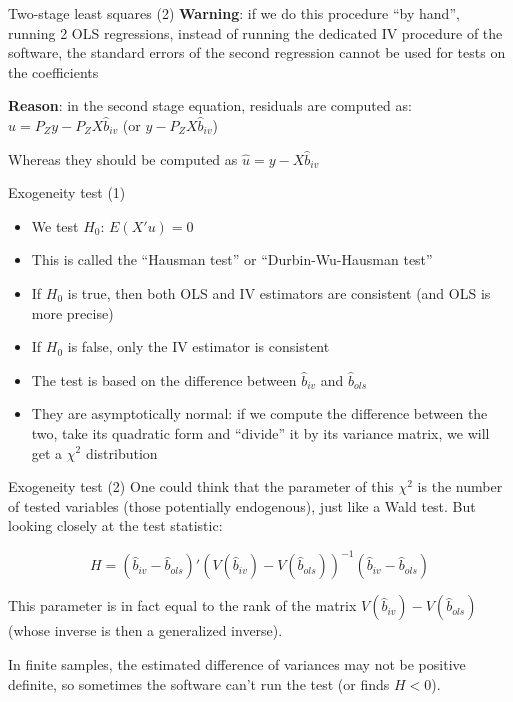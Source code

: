 \documentclass[aspectratio=169]{beamer}
\begin{document}
\begin{frame}{Two-stage least squares (2)}
\textbf{Warning}: if we do this procedure ``by hand'', running 2 OLS regressions, instead of running the dedicated IV procedure of the software, the standard errors of the second regression cannot be used for tests on the coefficients

\textbf{Reason}: in the second stage equation, residuals are computed as: $\hat{u} = P_Zy - P_ZX\hat{b}_{iv}$ (or $y - P_ZX\hat{b}_{iv}$)

Whereas they should be computed as $\hat{u} = y - X\hat{b}_{iv}$
\end{frame}

\begin{frame}{Exogeneity test (1)}
\begin{itemize}
    \item We test $H_0$: $E(X'u) = 0$
    \item This is called the ``Hausman test'' or ``Durbin-Wu-Hausman test''
    \item If $H_0$ is true, then both OLS and IV estimators are consistent (and OLS is more precise)
    \item If $H_0$ is false, only the IV estimator is consistent
    \item The test is based on the difference between $\hat{b}_{iv}$ and $\hat{b}_{ols}$
    \item They are asymptotically normal: if we compute the difference between the two, take its quadratic form and ``divide'' it by its variance matrix, we will get a $\chi^2$ distribution
\end{itemize}
\end{frame}

\begin{frame}{Exogeneity test (2)}
One could think that the parameter of this $\chi^2$ is the number of tested variables (those potentially endogenous), just like a Wald test. But looking closely at the test statistic:

\[H = (\hat{b}_{iv} - \hat{b}_{ols})'(V(\hat{b}_{iv}) - V(\hat{b}_{ols}))^{-1}(\hat{b}_{iv} - \hat{b}_{ols})\]

This parameter is in fact equal to the rank of the matrix $V(\hat{b}_{iv}) - V(\hat{b}_{ols})$ (whose inverse is then a generalized inverse).

In finite samples, the estimated difference of variances may not be positive definite, so sometimes the software can't run the test (or finds $H < 0$).
\end{frame}
\end{document}

